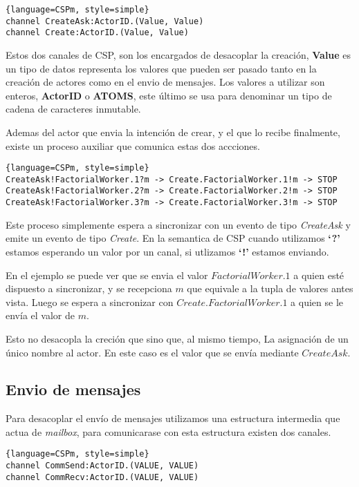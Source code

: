 \documentclass[fleqn]{article}
\begin{document}
\begin{lstlisting}{language=CSPm, style=simple}
channel CreateAsk:ActorID.(Value, Value)
channel Create:ActorID.(Value, Value)
\end{lstlisting}

Estos dos canales de CSP, son los encargados de desacoplar la creación,
\textbf{Value} es un tipo de datos representa los valores que pueden ser pasado
tanto en la creación de actores como en el envio de mensajes. Los valores a
utilizar son enteros, \textbf{ActorID} o \textbf{ATOMS}, este último se usa para
denominar un tipo de cadena de caracteres inmutable.

Ademas del actor que envia la intención de crear, y el que lo recibe finalmente,
existe un proceso auxiliar que comunica estas dos accciones.

\begin{lstlisting}{language=CSPm, style=simple}
CreateAsk!FactorialWorker.1?m -> Create.FactorialWorker.1!m -> STOP
CreateAsk!FactorialWorker.2?m -> Create.FactorialWorker.2!m -> STOP
CreateAsk!FactorialWorker.3?m -> Create.FactorialWorker.3!m -> STOP
\end{lstlisting}

Este proceso simplemente espera a sincronizar con un evento de tipo
\textit{CreateAsk} y emite un evento de tipo \textit{Create}.
En la semantica de CSP cuando utilizamos \textbf{`?'} estamos esperando un valor
por un canal, si utlizamos \textbf{`!'} estamos enviando.

En el ejemplo se puede ver que se envia el valor $FactorialWorker.1$ a quien esté
dispuesto a sincronizar, y se recepciona $m$ que equivale a la tupla de valores
antes vista. Luego se espera a sincronizar con $Create.FactorialWorker.1$ a
quien se le envía el valor de $m$.

Esto no desacopla la creción que sino que, al mismo tiempo, La asignación de un
único nombre al actor. En este caso es el valor que se envía mediante
$CreateAsk$.

\subsection{Envio de mensajes}
Para desacoplar el envío de mensajes utilizamos una estructura intermedia que
actua de \textit{mailbox}, para comunicarase con esta estructura existen dos canales.

\begin{lstlisting}{language=CSPm, style=simple}
channel CommSend:ActorID.(VALUE, VALUE)
channel CommRecv:ActorID.(VALUE, VALUE)
\end{lstlisting}
\end{document}
